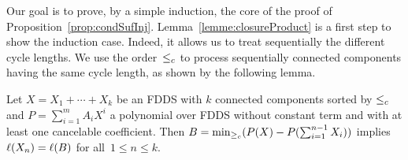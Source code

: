 	
	Our goal is to prove, by a simple induction, the core of the proof of Proposition~\ref{prop:condSufInj}. %
	Lemma~\ref{lemme:closureProduct} is a first step to show the induction case.
	Indeed, it allows us to treat sequentially the different cycle lengths. We use the order~$\le_{c}$ to process sequentially connected components having the same cycle length, as shown by the following lemma.
	
	\begin{lemma}\label{lemme:structurePolyFDDS}
		Let $X = X_1 + \cdots + X_k$ be an FDDS with $k$ connected components sorted by $\le_{c}$ and $P = \sum_{i=1}^{m} A_i X^i$ a polynomial over FDDS without constant term and with at least one cancelable coefficient. 
		Then $B = \min_{\ge_{c}}(P(X) - P(\sum_{i=1}^{n-1} X_i))$ implies $\ell(X_n) = \ell(B)$ for all~$1 \le n \le k$.
	\end{lemma}
	
